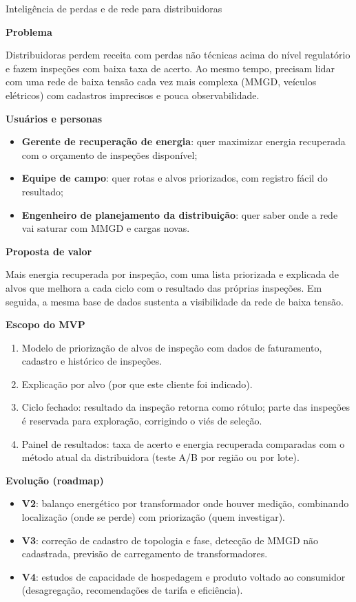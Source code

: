 \documentclass[10pt,a4paper,oneside]{article}
\newcommand{\prodsec}[1]{\par\medskip\noindent\textbf{\color{prodcolor}#1}\par\smallskip}
\begin{document}
\begin{produto}{Inteligência de perdas e de rede para distribuidoras}

\prodsec{Problema}
Distribuidoras perdem receita com perdas não técnicas acima do nível
regulatório e fazem inspeções com baixa taxa de acerto. Ao mesmo tempo,
precisam lidar com uma rede de baixa tensão cada vez mais complexa (MMGD,
veículos elétricos) com cadastros imprecisos e pouca observabilidade.

\prodsec{Usuários e personas}
\begin{itemize}
  \item \textbf{Gerente de recuperação de energia}: quer maximizar energia
    recuperada com o orçamento de inspeções disponível;
  \item \textbf{Equipe de campo}: quer rotas e alvos priorizados, com
    registro fácil do resultado;
  \item \textbf{Engenheiro de planejamento da distribuição}: quer saber onde a
    rede vai saturar com MMGD e cargas novas.
\end{itemize}

\prodsec{Proposta de valor}
Mais energia recuperada por inspeção, com uma lista priorizada e explicada de
alvos que melhora a cada ciclo com o resultado das próprias inspeções. Em
seguida, a mesma base de dados sustenta a visibilidade da rede de baixa
tensão.

\prodsec{Escopo do MVP}
\begin{enumerate}
  \item Modelo de priorização de alvos de inspeção com dados de faturamento,
    cadastro e histórico de inspeções.
  \item Explicação por alvo (por que este cliente foi indicado).
  \item Ciclo fechado: resultado da inspeção retorna como rótulo; parte das
    inspeções é reservada para exploração, corrigindo o viés de seleção.
  \item Painel de resultados: taxa de acerto e energia recuperada comparadas
    com o método atual da distribuidora (teste A/B por região ou por lote).
\end{enumerate}

\prodsec{Evolução (roadmap)}
\begin{itemize}
  \item \textbf{V2}: balanço energético por transformador onde houver
    medição, combinando localização (onde se perde) com priorização (quem
    investigar).
  \item \textbf{V3}: correção de cadastro de topologia e fase, detecção de
    MMGD não cadastrada, previsão de carregamento de transformadores.
  \item \textbf{V4}: estudos de capacidade de hospedagem e produto voltado ao
    consumidor (desagregação, recomendações de tarifa e eficiência).
\end{itemize}


\end{produto}
\end{document}
